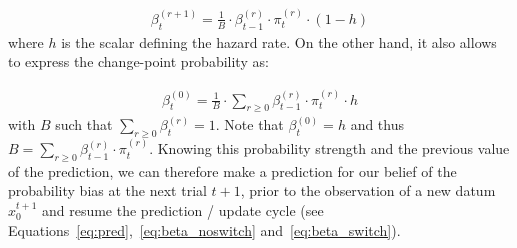 \documentclass[10pt,letterpaper]{article}
\newcommand{\eqa}[1]{\begin{align}#1\end{align}}
\begin{document}
\eqa{
\beta^{(r+1)}_t = \frac{1}{B} \cdot \beta^{(r)}_{t-1} \cdot \pi^{(r)}_{t} \cdot (1-h)
\label{eq:beta_noswitch}
}
where $h$ is the scalar defining the hazard rate.
On the other hand, it also allows to express the change-point probability as:

\eqa{
\beta^{(0)}_t  = \frac{1}{B} \cdot \sum_{r \geq 0} \beta^{(r)}_{t-1} \cdot \pi^{(r)}_{t} \cdot h
\label{eq:beta_switch}
}
with $B$ such that $\sum_{r \geq 0} \beta^{(r)}_{t} = 1$.
Note that $\beta^{(0)}_t=h$ and thus $B=\sum_{r \geq 0} \beta^{(r)}_{t-1} \cdot \pi^{(r)}_{t}$.
Knowing this probability strength and the previous value of the prediction, %
we can therefore make a prediction for our belief of the probability bias at the next trial $t+1$,
prior to the observation of a new datum $x_0^{t+1}$ and resume the prediction / update cycle (see Equations~\ref{eq:pred},~\ref{eq:beta_noswitch} and~\ref{eq:beta_switch}).
\end{document}
